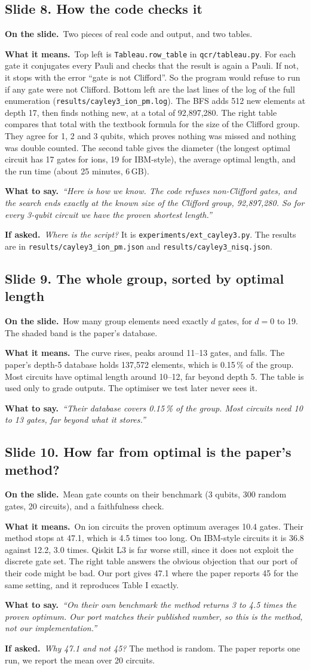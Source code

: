 \documentclass[11pt,a4paper]{article}
\newcommand{\say}[1]{\emph{``#1''}}
\newcommand{\slide}[2]{\subsection*{Slide #1. #2}}
\newcommand{\shows}{\par\textbf{\color{ibar}On the slide.}\ }
\newcommand{\means}{\par\textbf{\color{ibar}What it means.}\ }
\newcommand{\tosay}{\par\textbf{\color{ibar}What to say.}\ }
\newcommand{\ifasked}{\par\textbf{\color{ibar}If asked.}\ }
\begin{document}
\slide{8}{How the code checks it}
\shows Two pieces of real code and output, and two tables.
\means Top left is \texttt{Tableau.row\_table} in \texttt{qcr/tableau.py}. For each gate it conjugates every Pauli and
checks that the result is again a Pauli. If not, it stops with the error ``gate is not Clifford''. So the program would
refuse to run if any gate were not Clifford. Bottom left are the last lines of the log of the full enumeration
(\texttt{results/cayley3\_ion\_pm.log}). The BFS adds 512 new elements at depth 17, then finds nothing new, at a total of
92,897,280. The right table compares that total with the textbook formula for the size of the Clifford group. They agree
for 1, 2 and 3 qubits, which proves nothing was missed and nothing was double counted. The second table gives the
diameter (the longest optimal circuit has 17 gates for ions, 19 for IBM-style), the average optimal length, and the run
time (about 25 minutes, 6\,GB).
\tosay \say{Here is how we know. The code refuses non-Clifford gates, and the search ends exactly at the known size of the
Clifford group, 92,897,280. So for every 3-qubit circuit we have the proven shortest length.}
\ifasked \emph{Where is the script?} It is \texttt{experiments/ext\_cayley3.py}. The results are in
\texttt{results/cayley3\_ion\_pm.json} and \texttt{results/cayley3\_nisq.json}.

\slide{9}{The whole group, sorted by optimal length}
\shows How many group elements need exactly $d$ gates, for $d=0$ to 19. The shaded band is the paper's database.
\means The curve rises, peaks around 11--13 gates, and falls. The paper's depth-5 database holds 137,572 elements, which is
0.15\,\% of the group. Most circuits have optimal length around 10--12, far beyond depth 5. The table is used only to
grade outputs. The optimiser we test later never sees it.
\tosay \say{Their database covers 0.15\,\% of the group. Most circuits need 10 to 13 gates, far beyond what it stores.}

\slide{10}{How far from optimal is the paper's method?}
\shows Mean gate counts on their benchmark (3 qubits, 300 random gates, 20 circuits), and a faithfulness check.
\means On ion circuits the proven optimum averages 10.4 gates. Their method stops at 47.1, which is 4.5 times too long. On
IBM-style circuits it is 36.8 against 12.2, 3.0 times. Qiskit L3 is far worse still, since it does not exploit the discrete
gate set. The right table answers the obvious objection that our port of their code might be bad. Our port gives 47.1
where the paper reports 45 for the same setting, and it reproduces Table I exactly.
\tosay \say{On their own benchmark the method returns 3 to 4.5 times the proven optimum. Our port matches their published
number, so this is the method, not our implementation.}
\ifasked \emph{Why 47.1 and not 45?} The method is random. The paper reports one run, we report the mean over 20 circuits.
\end{document}
